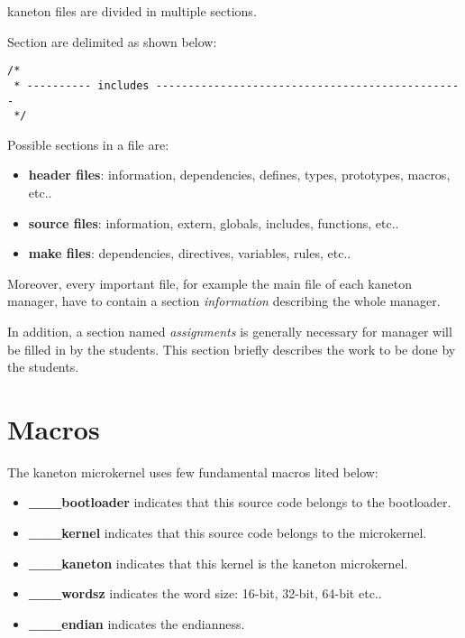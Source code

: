 kaneton files are divided in multiple sections.

Section are delimited as shown below:

\begin{verbatim}
/*
 * ---------- includes ------------------------------------------------
 */
\end{verbatim}

Possible sections in a file are:

\begin{itemize}
  \item
    \textbf{header files}: information, dependencies, defines, types,
    prototypes, macros, etc..
  \item
    \textbf{source files}: information, extern, globals, includes,
    functions, etc..
  \item
    \textbf{make files}: dependencies, directives, variables, rules, etc..
\end{itemize}

Moreover, every important file, for example the main file of each
kaneton manager, have to contain a section \textit{information} describing
the whole manager.

In addition, a section named \textit{assignments} is generally necessary
for manager will be filled in by the students. This section briefly describes
the work to be done by the students.

%
%

\section{Macros}

The kaneton microkernel uses few fundamental macros lited below:

\begin{itemize}
  \item
    \textbf{\_\_\_bootloader} indicates that this source code belongs to
    the bootloader.
  \item
    \textbf{\_\_\_kernel} indicates that this source code belongs to the
    microkernel.
  \item
    \textbf{\_\_\_kaneton} indicates that this kernel is the kaneton
    microkernel.
  \item
    \textbf{\_\_\_wordsz} indicates the word size: 16-bit, 32-bit,
    64-bit etc..
  \item
    \textbf{\_\_\_endian} indicates the endianness.
\end{itemize}
